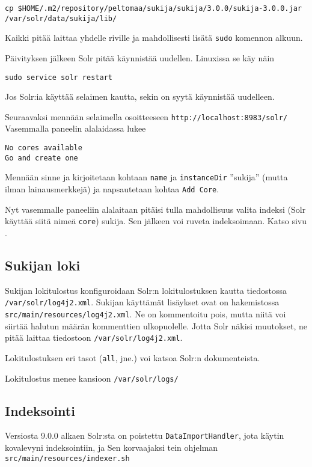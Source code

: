 \documentclass[12pt]{article}
\begin{document}
\verb=cp $HOME/.m2/repository/peltomaa/sukija/sukija/3.0.0/sukija-3.0.0.jar /var/solr/data/sukija/lib/=

Kaikki pitää laittaa yhdelle riville ja mahdollisesti lisätä
\verb=sudo= komennon alkuun.

Päivityksen jälkeen Solr pitää käynnistää uudellen. Linuxissa se käy
näin

\verb=sudo service solr restart=

Jos Solr:ia käyttää selaimen kautta, sekin on syytä käynnistää
uudelleen.


\bigskip
Seuraavaksi mennään selaimella osoitteeseen \verb=http://localhost:8983/solr/=
Vasemmalla paneelin alalaidassa lukee 

\begin{verbatim}
No cores available
Go and create one
\end{verbatim}

Mennään sinne ja kirjoitetaan kohtaan \verb=name= ja \verb=instanceDir=
''sukija'' (mutta ilman lainausmerkkejä) ja napsautetaan kohtaa
\verb=Add Core=.

Nyt vasemmalle paneeliin alalaitaan pitäisi tulla mahdollisuus valita
indeksi (Solr käyttää siitä nimeä \verb=core=) sukija. Sen jälkeen voi
ruveta indeksoimaan. Katso sivu .


\subsection*{Sukijan loki}

Sukijan lokitulostus konfiguroidaan Solr:n lokitulostuksen kautta
tiedostossa \verb=/var/solr/log4j2.xml=. Sukijan käyttämät lisäykset
ovat on hakemistossa \verb=src/main/resources/log4j2.xml=. Ne on
kommentoitu pois, mutta niitä voi siirtää halutun määrän kommenttien
ulkopuolelle. Jotta Solr näkisi muutokset, ne pitää laittaa tiedostoon
\verb=/var/solr/log4j2.xml=.

Lokitulostuksen eri tasot (\verb=all=, jne.) voi katsoa Solr:n
dokumenteista.

Lokitulostus menee kansioon \verb=/var/solr/logs/=


\newpage
\subsection*{Indeksointi}

Versiosta 9.0.0 alkaen Solr:sta on poistettu \verb=DataImportHandler=,
jota käytin kovalevyni indeksointiin, ja Sen korvaajaksi tein ohjelman
\verb=src/main/resources/indexer.sh=
\end{document}
